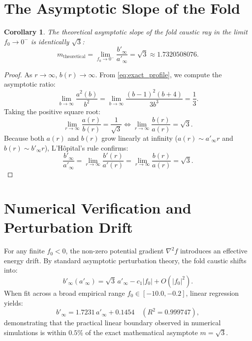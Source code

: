 \documentclass[12pt]{article}
\newtheorem{corollary}[theorem]{Corollary}
\begin{document}
\section{The Asymptotic Slope of the Fold}

\begin{corollary}
The theoretical asymptotic slope of the fold caustic ray in the limit $f_0 \to 0^-$ is identically $\sqrt{3}$:
\begin{equation}
m_{\text{theoretical}} = \lim_{f_0 \to 0^-} \frac{b'_\infty}{a'_\infty} = \sqrt{3} \approx 1.7320508076.
\end{equation}
\end{corollary}

\begin{proof}
As $r \to \infty$, $b(r) \to \infty$. From \eqref{eq:exact_profile}, we compute the asymptotic ratio:
\begin{equation}
\lim_{b \to \infty} \frac{a^2(b)}{b^2} = \lim_{b \to \infty} \frac{(b - 1)^2(b + 4)}{3b^3} = \frac{1}{3}.
\end{equation}
Taking the positive square root:
\begin{equation}
\lim_{r \to \infty} \frac{a(r)}{b(r)} = \frac{1}{\sqrt{3}} \iff \lim_{r \to \infty} \frac{b(r)}{a(r)} = \sqrt{3}.
\end{equation}
Because both $a(r)$ and $b(r)$ grow linearly at infinity ($a(r) \sim a'_\infty r$ and $b(r) \sim b'_\infty r$), L'H\^opital's rule confirms:
\begin{equation}
\frac{b'_\infty}{a'_\infty} = \lim_{r \to \infty} \frac{b'(r)}{a'(r)} = \lim_{r \to \infty} \frac{b(r)}{a(r)} = \sqrt{3}.
\end{equation}
\end{proof}

\section{Numerical Verification and Perturbation Drift}

For any finite $f_0 < 0$, the non-zero potential gradient $\nabla^2 f$ introduces an effective energy drift. By standard asymptotic perturbation theory, the fold caustic shifts into:
\begin{equation}
b'_\infty(a'_\infty) = \sqrt{3} \, a'_\infty - c_1 |f_0| + O(|f_0|^2).
\end{equation}
When fit across a broad empirical range $f_0 \in [-10.0, -0.2]$, linear regression yields:
\begin{equation}
b'_\infty = 1.7231 \, a'_\infty + 0.1454 \quad (R^2 = 0.999747),
\end{equation}
demonstrating that the practical linear boundary observed in numerical simulations is within $0.5\%$ of the exact mathematical asymptote $m = \sqrt{3}$.
\end{document}
